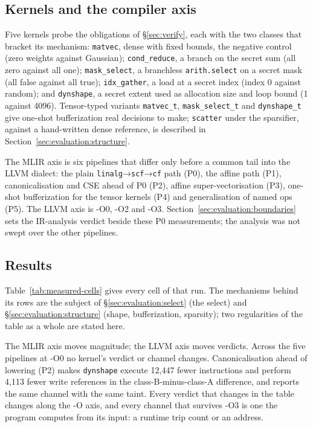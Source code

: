 \subsection{Kernels and the compiler axis}
Five kernels probe the obligations of \S\ref{sec:verify}, each with the two classes that bracket its mechanism: \texttt{matvec}, dense with fixed bounds, the negative control (zero weights against Gaussian); \texttt{cond\_reduce}, a branch on the secret sum (all zero against all one); \texttt{mask\_select}, a branchless \texttt{arith.select} on a secret mask (all false against all true); \texttt{idx\_gather}, a load at a secret index (index 0 against random); and \texttt{dynshape}, a secret extent used as allocation size and loop bound (1 against 4096). Tensor-typed variants \texttt{matvec\_t}, \texttt{mask\_select\_t} and \texttt{dynshape\_t} give one-shot bufferization real decisions to make; \texttt{scatter} under the sparsifier, against a hand-written dense reference, is described in Section~\ref{sec:evaluation:structure}.

The MLIR axis is six pipelines that differ only before a common tail into the LLVM dialect: the plain \texttt{linalg}→\texttt{scf}→\texttt{cf} path (P0), the affine path (P1), canonicalisation and CSE ahead of P0 (P2), affine super-vectorisation (P3), one-shot bufferization for the tensor kernels (P4) and generalisation of named ops (P5). The LLVM axis is -O0, -O2 and -O3. Section~\ref{sec:evaluation:boundaries} sets the IR-analysis verdict beside these P0 measurements; the analysis was not swept over the other pipelines.


\subsection{Results}

Table~\ref{tab:measured-cells} gives every cell of that run. The mechanisms behind its rows are the subject of \S\ref{sec:evaluation:select} (the select) and \S\ref{sec:evaluation:structure} (shape, bufferization, sparsity); two regularities of the table as a whole are stated here.


The MLIR axis moves magnitude; the LLVM axis moves verdicts. Across the five pipelines at -O0 no kernel's verdict or channel changes. Canonicalisation ahead of lowering (P2) makes \texttt{dynshape} execute 12,447 fewer instructions and perform 4,113 fewer write references in the class-B-minus-class-A difference, and reports the same channel with the same taint. Every verdict that changes in the table changes along the -O axis, and every channel that survives -O3 is one the program computes from its input: a runtime trip count or an address.

